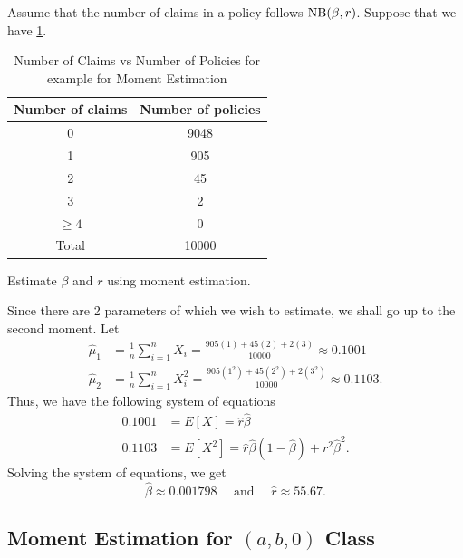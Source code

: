 \documentclass[notoc,notitlepage]{tufte-book}
\begin{document}
\begin{eg}
  Assume that the number of claims in a policy follows $\operatorname{NB}(\beta, r)$.
  Suppose that we have
  \cref{table:number_of_claims_vs_number_of_policies_for_example_for_moment_estimation}.
  \begin{table}[htpb]
    \centering
    \caption{Number of Claims vs Number of Policies for example for Moment
    Estimation}
    \label{table:number_of_claims_vs_number_of_policies_for_example_for_moment_estimation}
    \begin{tabular}{c c}
    Number of claims & Number of policies \\
    \hline
    0                & 9048 \\
    1                & 905 \\
    2                & 45 \\
    3                & 2 \\
    $\geq 4$         & 0 \\
    \hline
    Total            & 10000
    \end{tabular}
  \end{table}
  Estimate $\beta$ and $r$ using moment estimation.
\end{eg}

\begin{solution}
  Since there are 2 parameters of which we wish to estimate,
  we shall go up to the second moment. Let
  \begin{align*}
    \hat{\mu}_1 &= \frac{1}{n} \sum_{i=1}^{n} X_i
            = \frac{905(1) + 45(2) + 2(3)}{10000} \approx 0.1001 \\
    \hat{\mu}_2 &= \frac{1}{n} \sum_{i=1}^{n} X_i^2
            = \frac{905(1^2) + 45(2^2) + 2(3^2)}{10000} \approx 0.1103.
  \end{align*}
  Thus, we have the following system of equations
  \begin{align*}
    0.1001 &= E[X] = \hat{r}\hat{\beta} \\
    0.1103 &= E[X^2] = \hat{r}\hat{\beta}(1-\hat{\beta}) + r^2 \hat{\beta}^2.
  \end{align*}
  Solving the system of equations, we get
  \begin{equation*}
    \hat{\beta} \approx 0.001798 \quad\text{ and }\quad \hat{r} \approx 55.67.
  \end{equation*}
\end{solution}

\subsection{Moment Estimation for $(a, b, 0)$ Class}%
\label{sub:moment_estimation_for_a_b_0_class}
\end{document}
